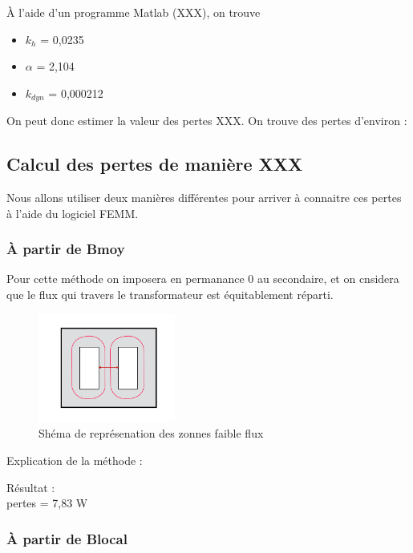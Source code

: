 À l'aide d'un programme Matlab (XXX), on trouve 
\begin{itemize}
\item  $k_h$   = 0,0235
\item $\alpha$ = 2,104
\item $k_{dyn}$ = 0,000212
\end{itemize}

On peut donc estimer la valeur des pertes XXX. On trouve des pertes d'environ : 



\subsection{Calcul des pertes de manière XXX}

Nous allons utiliser deux manières différentes pour arriver à connaitre ces pertes à l'aide du logiciel FEMM.

\subsubsection{À partir de Bmoy}

	Pour cette méthode on imposera en permanance 0 au secondaire, et on cnsidera que le flux qui travers le transformateur est équitablement réparti. \\

\begin{figure}[ht]
	\begin{center}
	\includegraphics[width=0.4\textwidth]{images/TP3_repartission_Bmoy}
	\caption{Shéma de représenation des zonnes faible flux}\label{img:RepChampsBmoy}
	\end{center}
\end{figure}
\FloatBarrier

Explication de la méthode : 


Résultat : \\
pertes = 7,83 W\\

\subsubsection{À partir de Blocal}

